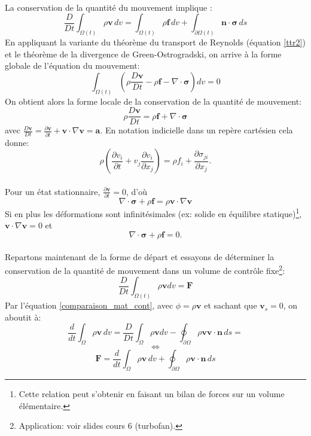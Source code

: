 \paragraph{}
La conservation de la quantité du mouvement implique : 
$$\frac{D}{Dt}\int_{\Omega (t)}\rho\textbf{v}\,dv=\int_{\Omega (t)}\rho\textbf{f}\,dv+\int_{\partial\Omega (t)}\textbf{\^n}\cdot\boldsymbol{\sigma}\,ds$$
En appliquant la variante du théorème du transport de Reynolds (équation \ref{ttr2}) et le théorème de la divergence de Green-Ostrogradski, on arrive à la forme globale de l'équation du mouvement:
$$\int_{\Omega (t)}\left(\rho\frac{D\textbf{v}}{Dt}-\rho\textbf{f}-\nabla\cdot\boldsymbol{\sigma}\right)dv=0$$
On obtient alors la forme locale de la conservation de la quantité de mouvement:
$$\boxed{\rho\frac{D\textbf{v}}{Dt}=\rho\textbf{f}+\nabla\cdot\boldsymbol{\sigma}}$$
avec $\frac{D\textbf{v}}{Dt}=\frac{\partial \textbf{v}}{\partial t}+\textbf{v}\cdot\nabla\textbf{v}=\textbf{a}$. En notation indicielle dans un repère cartésien cela donne:
$$\rho\left(\frac{\partial v_i}{\partial t}+v_j\frac{\partial v_i}{\partial x_j}\right)=\rho f_i+\frac{\partial \sigma_{ji}}{\partial x_j}.$$
\paragraph{}
Pour un état stationnaire, $\frac{\partial\textbf{v}}{\partial t}=0$, d'où $$\nabla\cdot\boldsymbol{\sigma}+\rho\textbf{f}=\rho\textbf{v}\cdot\nabla\textbf{v}$$ 
Si en plus les déformations sont infinitésimales (ex: solide en équilibre statique)\footnote{Cette relation peut s'obtenir en faisant un bilan de forces sur un volume élémentaire.}, $\textbf{v}\cdot\nabla\textbf{v}=0$ et
$$\nabla\cdot\boldsymbol{\sigma}+\rho\textbf{f}=0.$$
\paragraph{}
Repartons maintenant de la forme de départ et essayons de déterminer la conservation de la quantité de mouvement dans un volume de contrôle fixe\footnote{Application: voir slides cours 6 (turbofan).}:
$$\frac{D}{Dt}\int_{\Omega(t)}\rho\textbf{v}dv=\textbf{F}$$
Par l'équation \ref{comparaison_mat_cont}, avec $\phi=\rho\textbf{v}$ et sachant que $\textbf{v}_s=0$, on aboutit à:
$$\frac{d}{dt}\int_{\Omega }\rho\textbf{v}\, dv=\frac{D}{Dt}\int_{\Omega}\rho\textbf{v}dv-\oint_{\partial\Omega }\rho\textbf{v}\textbf{v}\cdot\textbf{\^n}\,ds=$$
$$\Leftrightarrow$$
$$\textbf{F}=\frac{d}{dt}\int_{\Omega}\rho\textbf{v}\, dv+\oint_{\partial\Omega }\rho\textbf{v}\cdot\textbf{\^n}\,ds$$

